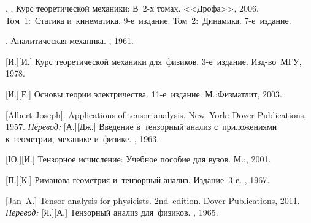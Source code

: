 \begin{thebibliography}{123}
\begin{otherlanguage}{russian}
, . Курс теоретической механики: В~2\hbox{-}х томах.
<<Дрофа>>, 2006.
%
Том~1:~Статика и~кинематика.
9\hbox{-}е~издание.
%
Том~2:~Динамика.
7\hbox{-}е~издание.

.
Аналитическая механика.
\fizmatgiz, 1961.

[И.][И.] Курс теоретической механики для~физиков. 3\hbox{-}е~издание. Изд\hbox{-}во~МГУ, 1978. 

[И.][Е.] %
Основы теории электричества. 11\hbox{-}е~издание. М.:\;Физматлит, 2003.

%
%



[Albert Joseph]. Applications of tensor analysis. New~York: Dover Publications, 1957. 
\emph{Перевод:} [А.][Дж.] Введение в~тензорный анализ с~приложениями к~геометрии, механике и~физике. \fizmatgiz, 1963. 

[Ю.][И.]
Тензорное исчисление: Учебное пособие для вузов.
М.:\;, 2001.

[П.][К.]
Риманова геометрия и~тензорный анализ.
Издание~3\hbox{-}е. \naukapublisher, 1967.

[Jan~A.] Tensor analysis for physicists. 2nd~edition. Dover Publications, 2011. 
\emph{Перевод:} [Я.][А.] Тензорный анализ для~физиков. \naukapublisher, 1965. 


\end{otherlanguage}
\end{thebibliography}
